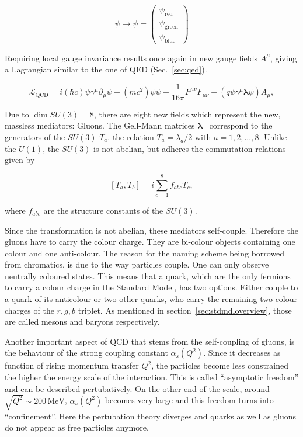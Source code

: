 \begin{equation}
  \label{eq:colorspinor}
  \psi \rightarrow \psi = \begin{pmatrix}
    \psi_{\text{red}} \\
    \psi_{\text{green}} \\
    \psi_{\text{blue}}
  \end{pmatrix}
\end{equation}

\noindent Requiring local gauge invariance results once again in new gauge fields $A^\mu$, giving a Lagrangian similar to the one of QED (Sec.~\ref{sec:qed}).

\begin{equation}
  \label{eq:qcdlagrangian}
  \mathcal{L}_{\text{QCD}} = i (\hbar c) \bar{\psi} \gamma^\mu \partial_\mu \psi - (m c^2) \bar{\psi} \psi - \frac{1}{16 \pi} F^{\mu \nu} F_{\mu \nu} - (q \bar{\psi} \gamma^\mu \mathbf{\lambda} \psi) A_\mu,
\end{equation}

Due to $\dim{SU(3)} = 8$, there are eight new fields which represent the new, massless mediators: Gluons. The Gell-Mann matrices $\mathbf{\lambda}$~\cite{gellmann} correspond to the generators of the $SU(3)$ $T_a$. the relation $T_a = \lambda_a / 2$ with $a = 1, 2, ..., 8$. Unlike the $U(1)$, the $SU(3)$ is not abelian, but adheres the commutation relations given by

\begin{equation}
  \label{eq:qcdgencommute}
  \left[ T_a, T_b \right] = i \sum_{c=1}^8 f_{abc} T_c,
\end{equation}

\noindent where $f_{abc}$ are the structure constants of the $SU(3)$. 

Since the transformation is not abelian, these mediators self-couple. Therefore the gluons have to carry the colour charge. They are bi-colour objects containing one colour and one anti-colour. The reason for the naming scheme being borrowed from chromatics, is due to the way particles couple. One can only observe neutrally coloured states. This means that a quark, which are the only fermions to carry a colour charge in the Standard Model, has two options. Either couple to a quark of its anticolour or two other quarks, who carry the remaining two colour charges of the $r,g,b$ triplet. As mentioned in section~\ref{sec:stdmdloverview}, those are called mesons and baryons respectively.

Another important aspect of QCD that stems from the self-coupling of gluons, is the behaviour of the strong coupling constant $\alpha_s(Q^2)$. Since it decreases as function of rising momentum transfer $Q^2$, the particles become less constrained the higher the energy scale of the interaction. This is called ``asymptotic freedom'' and can be described pertubatively. On the other end of the scale, around $\sqrt{Q^2} \sim 200\,\text{MeV}$, $\alpha_s(Q^2)$ becomes very large and this freedom turns into ``confinement''. Here the pertubation theory diverges and quarks as well as gluons do not appear as free particles anymore.

